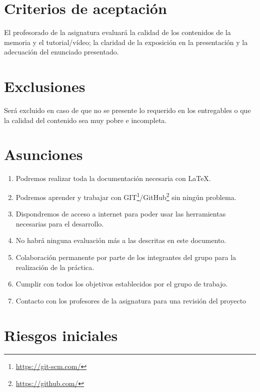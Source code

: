 \documentclass[a4paper,10pt]{scrartcl}
\begin{document}
\section{Criterios de aceptación}
El profesorado de la asignatura evaluará la calidad de los contenidos de la memoria y el tutorial/vídeo; la claridad de la exposición en la presentación y la adecuación del enunciado presentado.

\section{Exclusiones}
Será excluido en caso de que no se presente lo requerido en los entregables o que la calidad del contenido sea muy pobre e incompleta.


\section{Asunciones}

	\begin{enumerate}
		\item Podremos realizar toda la documentación necesaria con \LaTeX.
		
		\item Podremos aprender y trabajar con GIT\footnote{\url{https://git-scm.com/}}/GitHub\footnote{\url{https://github.com/}} sin ningún problema.
		
		\item Dispondremos de acceso a internet para poder usar las herramientas necesarias para el desarrollo.

		\item No habrá ninguna evaluación más a las descritas en este documento.
		
		\item Colaboración permanente por parte de los integrantes del grupo para la realización de la práctica.
		
		\item Cumplir con todos los objetivos establecidos por el grupo de trabajo.
		
		\item Contacto con los profesores de la asignatura para una revisión del proyecto
	\end{enumerate}


\section{Riesgos iniciales}
\end{document}
